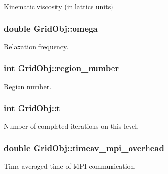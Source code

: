 Kinematic viscosity (in lattice units) 

\subsubsection[{\texorpdfstring{omega}{omega}}]{\setlength{\rightskip}{0pt plus 5cm}double Grid\+Obj\+::omega}\hypertarget{class_grid_obj_a21461e5d39c5ae83ae42170c829e9da3}{}\label{class_grid_obj_a21461e5d39c5ae83ae42170c829e9da3}


Relaxation frequency. 

\subsubsection[{\texorpdfstring{region\+\_\+number}{region_number}}]{\setlength{\rightskip}{0pt plus 5cm}int Grid\+Obj\+::region\+\_\+number}\hypertarget{class_grid_obj_ae0b724f2d977cfe38df2bb191e2fb042}{}\label{class_grid_obj_ae0b724f2d977cfe38df2bb191e2fb042}


Region number. 

\subsubsection[{\texorpdfstring{t}{t}}]{\setlength{\rightskip}{0pt plus 5cm}int Grid\+Obj\+::t}\hypertarget{class_grid_obj_a783b18a053e244ae7b7b436ab21c0592}{}\label{class_grid_obj_a783b18a053e244ae7b7b436ab21c0592}


Number of completed iterations on this level. 

\subsubsection[{\texorpdfstring{timeav\+\_\+mpi\+\_\+overhead}{timeav_mpi_overhead}}]{\setlength{\rightskip}{0pt plus 5cm}double Grid\+Obj\+::timeav\+\_\+mpi\+\_\+overhead}\hypertarget{class_grid_obj_a147cfb80b653ca4432432e8185cf38ef}{}\label{class_grid_obj_a147cfb80b653ca4432432e8185cf38ef}


Time-\/averaged time of M\+PI communication. 

